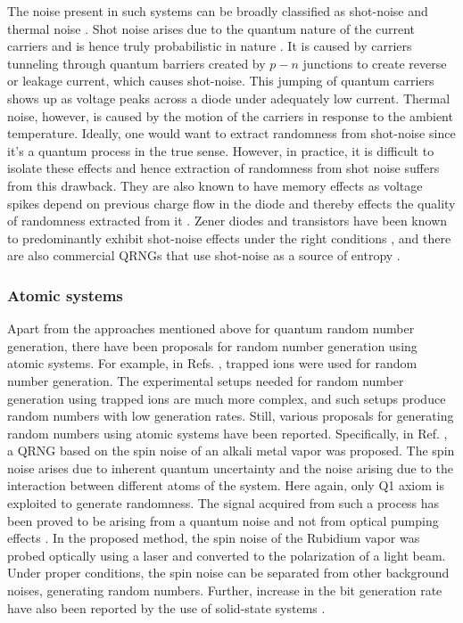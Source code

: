 \documentclass[]{interact}
\theoremstyle{plain}%
\theoremstyle{definition}
\theoremstyle{remark}
\begin{document}
The noise present in such systems can be broadly classified as shot-noise \cite{https://doi.org/10.1002/andp.19183622304} and thermal noise \cite{PhysRev.32.110,PhysRev.32.97}. Shot noise arises due to the quantum nature of the current carriers and is hence truly probabilistic in nature \cite{REZNIKOV1998901}. It is caused
by carriers tunneling through quantum barriers created by $p-n$ junctions to create reverse or leakage current, which causes shot-noise. This jumping of quantum carriers shows up as voltage peaks across a  diode under adequately low current. Thermal noise, however, is caused by the motion of the carriers in response to the ambient temperature. Ideally, one would want to extract randomness from shot-noise since it's a  quantum process in the true sense. However, in practice, it is difficult to isolate these effects \cite{PhysRevB.47.16427} and hence extraction of randomness from shot noise suffers from this drawback. They are also known to have memory effects as voltage spikes depend on previous charge flow in the diode and thereby effects the quality of randomness extracted from it \cite{5967293}. Zener diodes and transistors have been known to predominantly exhibit shot-noise effects under the right conditions \cite{doi:10.1063/1.1809295, ReallyRe55:online}, and there are also commercial QRNGs that use shot-noise as a source of entropy \cite{Devicean84:online,Generato36:online}.  

\subsubsection{Atomic systems}
Apart from the approaches mentioned above for quantum random number generation, there have been proposals for random number generation using atomic systems. For example, in Refs. \cite{Pironio2010,um2013experimental},  trapped ions were used for random number generation. The experimental setups needed for random number generation using trapped ions are much more complex, and such setups produce random numbers with low generation rates. Still, various proposals for generating random numbers using atomic systems have been reported. Specifically, in Ref. \cite{PhysRevA.77.054101}, a QRNG based on the spin noise of an alkali metal vapor was proposed. The spin noise arises due to inherent quantum uncertainty and the noise arising due to the interaction between different atoms of the system.  Here again, only Q1 axiom is exploited to generate randomness. The signal acquired from such a process has been proved to be arising from a quantum noise and not from optical
pumping effects \cite{PhysRevA.75.042502}. In the proposed method, the spin noise of the Rubidium vapor was probed optically using a laser and converted to the polarization of a light beam. Under proper conditions, the spin noise can be separated from other background noises, generating random numbers. Further, increase in the bit generation rate have also been reported by the use of solid-state systems \cite{PhysRevLett.95.216603,PhysRevLett.98.176401}.
\end{document}
